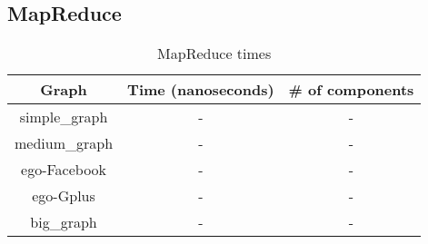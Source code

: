 \subsection{MapReduce}

\begin{table}[h!]
\footnotesize
\begin{center}
\begin{tabular}{|c|c|c|}
\hline
{\bf Graph} & {\bf Time (nanoseconds)}& {\bf \# of components} \\
\hline
\hline
simple\_graph   & -  & -  \\
\hline
medium\_graph   & -  & -   \\
\hline
ego-Facebook   & -  & -  \\
\hline
ego-Gplus   & -  & -\\
\hline
big\_graph   & -  & -  \\
\hline
\end{tabular}
\caption{MapReduce times}
\label{tb:mapreducetimes}
\end{center}
\end{table}
